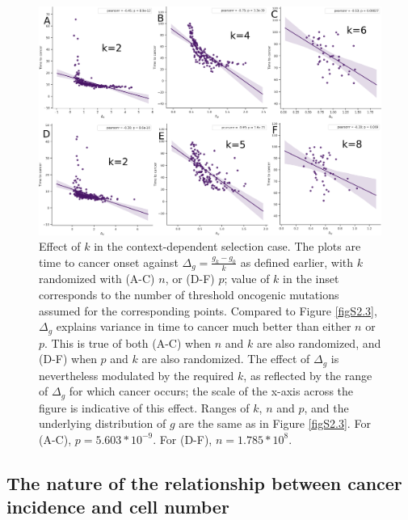\documentclass[10pt,twocolumn,twoside]{article}
\begin{document}
		\begin{figure}[tbhp]
			\centering
			\includegraphics[width=\linewidth, keepaspectratio=true]{figS2-4.png}
			\caption{Effect of $k$ in the context-dependent selection case. The plots are time to cancer onset against $\Delta_{g} = \frac{g_{k}-g_{0}}{k}$ as defined earlier, with $k$ randomized with (A-C) $n$, or (D-F) $p$; value of $k$ in the inset corresponds to the number of threshold oncogenic mutations assumed for the corresponding points. Compared to Figure \ref{figS2.3}, $\Delta_{g}$ explains variance in time to cancer much better than either $n$ or $p$. This is true of both (A-C) when $n$ and $k$ are also randomized, and (D-F) when $p$ and $k$ are also randomized. The effect of $\Delta_{g}$ is nevertheless modulated by the required $k$, as reflected by the range of $\Delta_{g}$ for which cancer occurs; the scale of the x-axis across the figure is indicative of this effect. Ranges of $k$, $n$ and $p$, and the underlying distribution of $g$ are the same as in Figure \ref{figS2.3}. For (A-C), $p=5.603*10^{-9}$. For (D-F), $n=1.785*10^{8}$.}
			\label{figS2.4}
		\end{figure}

	\subsection{The nature of the relationship between cancer incidence and cell number}\label{S3 Text}
		\renewcommand{\thefigure}{S3.\arabic{figure}}
		\setcounter{figure}{0}

		\renewcommand{\thetable}{S3.\arabic{table}}
		\setcounter{table}{0}
\end{document}
